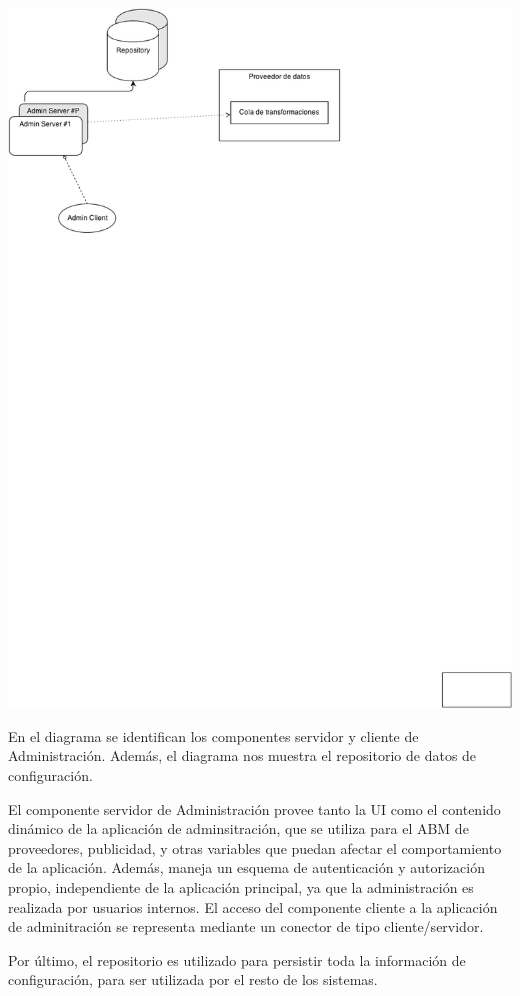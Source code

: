 \includegraphics[scale=0.5]{ISW2_cNc_Administracion}

En el diagrama se identifican los componentes servidor y cliente de Administraci\'on. Adem\'as, el diagrama nos muestra el repositorio de datos de configuraci\'on.

El componente servidor de Administraci\'on provee tanto la UI como el contenido din\'amico de la aplicaci\'on de adminsitraci\'on, que se utiliza para el ABM de proveedores, publicidad, y otras variables que puedan afectar el comportamiento de la aplicaci\'on. Adem\'as, maneja un esquema de autenticaci\'on y autorizaci\'on propio, independiente de la aplicaci\'on principal, ya que la administraci\'on es realizada por usuarios internos. El acceso del componente cliente a la aplicaci\'on de adminitraci\'on se representa mediante un conector de tipo cliente/servidor.

Por \'ultimo, el repositorio es utilizado para persistir toda la informaci\'on de configuraci\'on, para ser utilizada por el resto de los sistemas.


